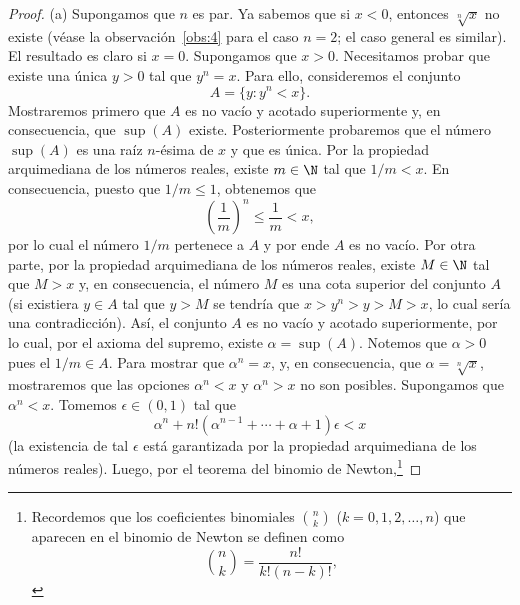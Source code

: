\documentclass[12pt,a4paper]{book}
\begin{document}
    \begin{proof}
        (a) Supongamos que $n$ es par. Ya sabemos que si $x<0$,
        entonces $\sqrt[n]{x}$ no existe (véase la observación~\ref{obs:4} para el caso $n=2$; el caso
        general es similar). El resultado es claro si $x=0$. Supongamos que $x>0$.
        Necesitamos probar que existe una única $y>0$ tal que $y^{n}=x$. Para ello,
        consideremos el conjunto
        \begin{equation*}
            A=\{y:y^{n}<x\}.
        \end{equation*}
        Mostraremos primero que $A$ es no vacío y acotado superiormente y, en consecuencia,
        que $\sup(A)$ existe. Posteriormente probaremos que el número $\sup(A)$
        es una raíz $n$-ésima de $x$ y que es única. Por la propiedad arquimediana de
        los números reales, existe $m\in\N$ tal que $1/m<x$. En consecuencia, puesto
        que $1/m\leq 1$, obtenemos que
        \begin{equation*}
            \left(\frac{1}{m}\right)^{n}\leq\frac{1}{m}<x,
        \end{equation*}
        por lo cual el número $1/m$ pertenece a $A$ y por ende $A$ es no vacío. Por otra
        parte, por la propiedad arquimediana de los números reales, existe $M\in\N$ tal
        que $M>x$ y, en consecuencia, el número $M$ es una cota superior del conjunto
        $A$ (si existiera $y\in A$ tal que $y>M$ se tendría que $x>y^{n}>y>M>x$,
        lo cual sería una contradicción). Así, el conjunto $A$ es no vacío y acotado
        superiormente, por lo cual, por el axioma del supremo, existe $\alpha=\sup(A)$.
        Notemos que $\alpha>0$ pues el $1/m\in A$. Para mostrar que $\alpha^{n}=x$, y, en
        consecuencia, que $\alpha=\sqrt[n]{x}$, mostraremos que las opciones $\alpha^{n}<x$ y $\alpha^{n}>x$
        no son posibles. Supongamos que $\alpha^{n}<x$. Tomemos $\epsilon\in(0,1)$ tal que
        \begin{equation*}
            \alpha^{n}+n!\left(\alpha^{n-1}+\cdots+\alpha+1\right)\epsilon<x
        \end{equation*}
        (la existencia de tal $\epsilon$ está garantizada por la propiedad arquimediana de los
        números reales). Luego, por el teorema del binomio de Newton,\footnote{Recordemos que los coeficientes binomiales
        $\binom{n}{k}$ ($k=0,1,2,\ldots,n$) que aparecen en el binomio de Newton se definen como
        \begin{equation*}
            \binom{n}{k}=\frac{n!}{k!(n-k)!},
        \end{equation*}
}
\end{proof}
\end{document}

